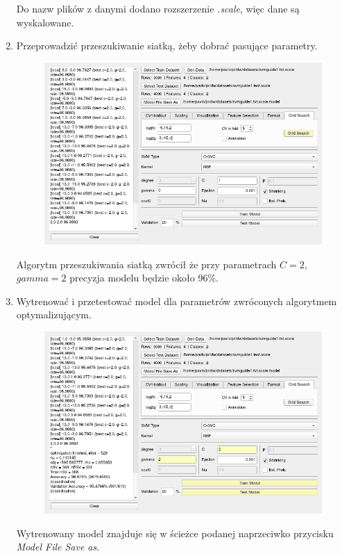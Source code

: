 \documentclass[paper=a4, fontsize=11pt]{scrartcl} %
\numberwithin{equation}{section} %
\numberwithin{figure}{section} %
\begin{document}
\begin{enumerate}[label={\textbf{Krok \theenumi :}},leftmargin=*]
    Do nazw plików z danymi dodano rozszerzenie \textit{.scale}, więc dane są wyskalowane.

    \item Przeprowadzić przeszukiwanie siatką, żeby dobrać pasujące parametry.

    \begin{figure}[H]
        \begin{center}
            \includegraphics[scale=0.7]{./img/ex1_st3.png}
        \end{center}
    \end{figure}

    Algorytm przeszukiwania siatką zwrócił że przy parametrach $C=2$, $gamma=2$ precyzja modelu
    będzie około 96\%.

    \item Wytrenować i przetestować model dla parametrów zwróconych algorytmem optymalizującym.

    \begin{figure}[H]
        \begin{center}
            \includegraphics[scale=0.7]{./img/ex1_st4.png}
        \end{center}
    \end{figure}

    Wytrenowany model znajduje się w ścieżce podanej naprzeciwko przycisku \textit{Model File
    Save as}. 
\end{enumerate}
\end{document}
